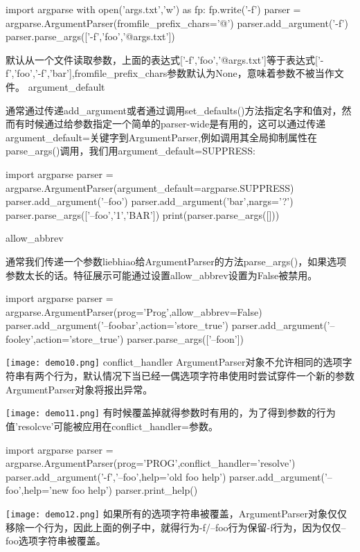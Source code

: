 \begin{python}
import argparse
with open('args.txt','w') as fp:
    fp.write('-f\nbar')
parser = argparse.ArgumentParser(fromfile_prefix_chars='@')
parser.add_argument('-f')
parser.parse_args(['-f','foo','@args.txt'])
\end{python}
默认从一个文件读取参数，上面的表达式['-f','foo','@args.txt']等于表达式['-f','foo','-f','bar'],fromfile\_prefix\_chars参数默认为None，意味着参数不被当作文件。
argument\_default\par
通常通过传递add\_argument或者通过调用set\_defaults()方法指定名字和值对，然而有时候通过给参数指定一个简单的parser-wide是有用的，这可以通过传递argument\_default=关键字到ArgumentParser,例如调用其全局抑制属性在parse\_args()调用，我们用argument\_default=SUPPRESS:
\begin{python}
import argparse
parser = argparse.ArgumentParser(argument_default=argparse.SUPPRESS)
parser.add_argument('--foo')
parser.add_argument('bar',nargs='?')
parser.parse_args(['--foo','1','BAR'])
print(parser.parse_args([]))
\end{python}
allow\_abbrev\par
通常我们传递一个参数liebhiao给ArgumentParser的方法parse\_args()，如果选项参数太长的话。特征展示可能通过设置allow\_abbrev设置为False被禁用。
\begin{python}
import argparse
parser = argparse.ArgumentParser(prog='Prog',allow_abbrev=False)
parser.add_argument('--foobar',action='store_true')
parser.add_argument('--fooley',action='store_true')
parser.parse_args(['--foon'])
\end{python}
\texttt{[image: demo10.png]}\newline
conflict\_handler\newline
ArgumentParser对象不允许相同的选项字符串有两个行为，默认情况下当已经一偶选项字符串使用时尝试穿件一个新的参数ArgumentParser对象将报出异常。\par
\texttt{[image: demo11.png]}
有时候覆盖掉就得参数时有用的，为了得到参数的行为值'resolcve'可能被应用在conflict\_handler=参数。
\begin{python}
import argparse
parser = argparse.ArgumentParser(prog='PROG',conflict_handler='resolve')
parser.add_argument('-f','--foo',help='old foo help')
parser.add_argument('--foo',help='new foo help')
parser.print_help()
\end{python}
\texttt{[image: demo12.png]}\newline
如果所有的选项字符串被覆盖，ArgumentParser对象仅仅移除一个行为，因此上面的例子中，就得行为-f/--foo行为保留-f行为，因为仅仅--foo选项字符串被覆盖。
